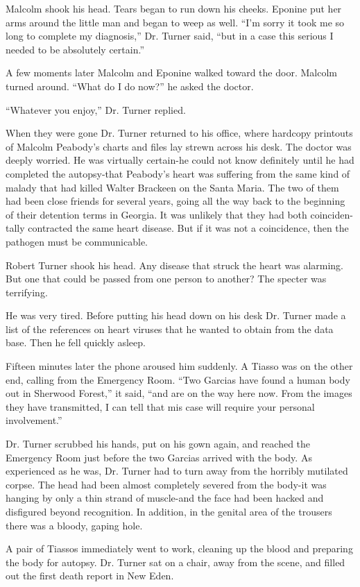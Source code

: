 \documentclass[]{article}
\begin{document}
{Malcolm shook his head. Tears began to run down his cheeks. Eponine put her arms around the little man and began to weep as well. “I’m sorry it took me so long to complete my diagnosis,” Dr. Turner said, “but in a case this serious I needed to be absolutely certain.”

A few moments later Malcolm and Eponine walked toward the door. Malcolm turned around. “What do I do now?” he asked the doctor.

“Whatever you enjoy,” Dr. Turner replied.

When they were gone Dr. Turner returned to his office, where hardcopy printouts of Malcolm Peabody’s charts and files lay strewn across his desk. The doctor was deeply worried. He was virtually certain-he could not know definitely until he had completed the autopsy-that Peabody’s heart was suffering from the same kind of malady that had killed Walter Brackeen on the Santa Maria. The two of them had been close friends for several years, going all the way back to the beginning of their detention terms in Georgia. It was unlikely that they had both coinciden-tally contracted the same heart disease. But if it was not a coincidence, then the pathogen must be communicable.

Robert Turner shook his head. Any disease that struck the heart was alarming. But one that could be passed from one person to another? The specter was terrifying.

He was very tired. Before putting his head down on his desk Dr. Turner made a list of the references on heart viruses that he wanted to obtain from the data base. Then he fell quickly asleep.

Fifteen minutes later the phone aroused him suddenly. A Tiasso was on the other end, calling from the Emergency Room. “Two Garcias have found a human body out in Sherwood Forest,” it said, “and are on the way here now. From the images they have transmitted, I can tell that mis case will require your personal involvement.”

Dr. Turner scrubbed his hands, put on his gown again, and reached the Emergency Room just before the two Garcias arrived with the body. As experienced as he was, Dr. Turner had to turn away from the horribly mutilated corpse. The head had been almost completely severed from the body-it was hanging by only a thin strand of muscle-and the face had been hacked and disfigured beyond recognition. In addition, in the genital area of the trousers there was a bloody, gaping hole.

A pair of Tiassos immediately went to work, cleaning up the blood and preparing the body for autopsy. Dr. Turner sat on a chair, away from the scene, and filled out the first death report in New Eden.

}
\end{document}
